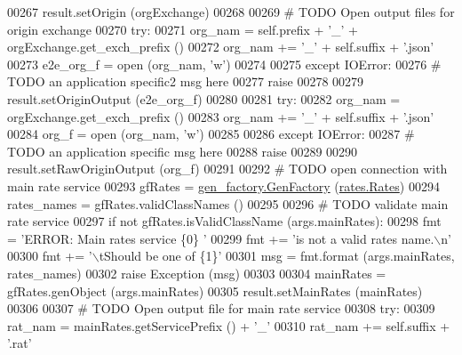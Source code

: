 \begin{DoxyCode}
00267         result.setOrigin (orgExchange)
00268             
00269         \textcolor{comment}{# TODO Open output files for origin exchange}
00270         \textcolor{keywordflow}{try}:
00271             org\_nam  =  self.prefix + \textcolor{stringliteral}{'\_'} + orgExchange.get\_exch\_prefix ()
00272             org\_nam += \textcolor{stringliteral}{'\_'} + self.suffix + \textcolor{stringliteral}{'.json'}
00273             e2e\_org\_f = open (org\_nam, \textcolor{stringliteral}{'w'})
00274             
00275         \textcolor{keywordflow}{except} IOError:
00276             \textcolor{comment}{# TODO an application specific2 msg here}
00277             \textcolor{keywordflow}{raise}
00278 
00279         result.setOriginOutput (e2e\_org\_f)
00280             
00281         \textcolor{keywordflow}{try}:
00282             org\_nam  = orgExchange.get\_exch\_prefix ()
00283             org\_nam += \textcolor{stringliteral}{'\_'} + self.suffix + \textcolor{stringliteral}{'.json'}
00284             org\_f = open (org\_nam, \textcolor{stringliteral}{'w'})
00285             
00286         \textcolor{keywordflow}{except} IOError:
00287             \textcolor{comment}{# TODO an application specific msg here}
00288             \textcolor{keywordflow}{raise}
00289             
00290         result.setRawOriginOutput (org\_f)
00291             
00292         \textcolor{comment}{# TODO open connection with main rate service}
00293         gfRates = \hyperlink{classgen__factory_1_1_gen_factory}{gen\_factory.GenFactory} (\hyperlink{classrates_1_1_rates}{rates.Rates})
00294         rates\_names = gfRates.validClassNames ()
00295 
00296         \textcolor{comment}{# TODO validate main rate service}
00297         \textcolor{keywordflow}{if} \textcolor{keywordflow}{not} gfRates.isValidClassName (args.mainRates):
00298             fmt  = \textcolor{stringliteral}{'ERROR: Main rates service \{0\} '}
00299             fmt += \textcolor{stringliteral}{'is not a valid rates name.\(\backslash\)n'}
00300             fmt += \textcolor{stringliteral}{'\(\backslash\)tShould be one of \{1\}'}
00301             msg = fmt.format (args.mainRates, rates\_names)
00302             \textcolor{keywordflow}{raise} Exception (msg)
00303 
00304         mainRates = gfRates.genObject (args.mainRates)
00305         result.setMainRates (mainRates)
00306         
00307         \textcolor{comment}{# TODO Open output file for main rate service}
00308         \textcolor{keywordflow}{try}:
00309             rat\_nam  =  mainRates.getServicePrefix () + \textcolor{stringliteral}{'\_'}
00310             rat\_nam +=  self.suffix + \textcolor{stringliteral}{'.rat'}

\end{DoxyCode}
